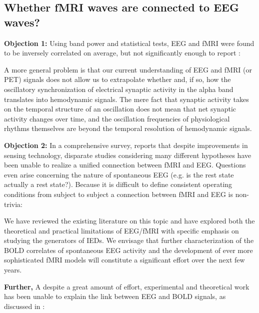 \subsection{Whether fMRI waves are connected to EEG waves?}
\textbf{Objection 1:} Using band power and statistical tests, EEG and fMRI were found to be inversely correlated on average, but not significantly enough to report \cite{LAUFS20031463}:
\begin{displayquote}
A more general problem is that our current understanding of EEG and fMRI (or PET) signals does not allow us to extrapolate whether and, if so, how the oscillatory synchronization of electrical synaptic activity in the alpha band translates into hemodynamic signals. The mere fact that synaptic activity takes on the temporal structure of an oscillation does not mean that net synaptic activity changes over time, and the oscillation frequencies of physiological rhythms themselves are beyond the temporal resolution of hemodynamic signals.
\end{displayquote}
\textbf{Objection 2:} In a comprehensive survey, \cite{SALEKHADDADI2003110} reports that despite improvements in sensing technology, disparate studies considering many different hypotheses have been unable to realize a unified connection between fMRI and EEG. Questions even arise concerning the nature of spontaneous EEG (e.g. is the rest state actually a rest state?). Because it is difficult to define consistent operating conditions from subject to subject a connection between fMRI and EEG is non-trivia:
\begin{displayquote}
We have reviewed the existing literature on this topic and have explored both the theoretical and practical limitations of EEG/fMRI with specific emphasis on studying the generators of IEDs. We envisage that further characterization of the BOLD correlates of spontaneous EEG activity and the development of ever more sophisticated fMRI models will constitute a significant effort over the next few years.
\end{displayquote}
\textbf{Further,} A despite a great amount of effort, experimental and theoretical work has been unable to explain the link between EEG and BOLD signals, as discussed in \cite{10.3389/fneur.2013.00001}:
